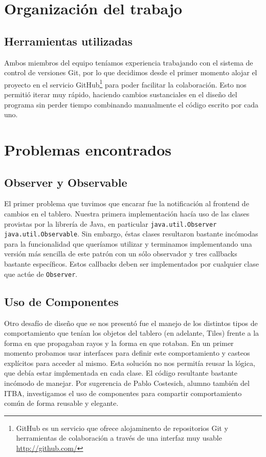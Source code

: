 \documentclass[a4paper, 11pt]{article}
\begin{document}
\section{Organización del trabajo}

	\subsection{Herramientas utilizadas}
	Ambos miembros del equipo teníamos experiencia trabajando con el sistema de control de versiones Git, por lo que decidimos desde el primer momento alojar el proyecto en el servicio GitHub\footnote{GitHub es un servicio que ofrece alojaminento de repositorios Git y herramientas de colaboración a través de una interfaz muy usable \href{http://github.com/}{http://github.com/}} para poder facilitar la colaboración. Esto nos permitió iterar muy rápido, haciendo cambios sustanciales en el diseño del programa sin perder tiempo combinando manualmente el código escrito por cada uno.

\section{Problemas encontrados}

	\subsection{Observer y Observable}
	El primer problema que tuvimos que encarar fue la notificación al frontend de cambios en el tablero. Nuestra primera implementación hacía uso de las clases provistas por la librería de Java, en particular \texttt{java.util.Observer} \texttt{java.util.Observable}. Sin embargo, éstas clases resultaron bastante incómodas para la funcionalidad que queríamos utilizar y terminamos implementando una versión más sencilla de este patrón con un sólo observador y tres callbacks bastante específicos. Estos callbacks deben ser implementados por cualquier clase que actúe de \texttt{Observer}.

	\subsection{Uso de Componentes}
	Otro desafío de diseño que se nos presentó fue el manejo de los distintos tipos de comportamiento que tenían los objetos del tablero (en adelante, Tiles) frente a la forma en que propagaban rayos y la forma en que rotaban. En un primer momento probamos usar interfaces para definir este comportamiento y casteos explícitos para acceder al mismo. Esta solución no nos permitía reusar la lógica, que debía estar implementada en cada clase. El código resultante bastante incómodo de manejar. Por sugerencia de Pablo Costesich, alumno también del ITBA, investigamos el uso de componentes para compartir comportamiento común de forma reusable y elegante.
\end{document}
